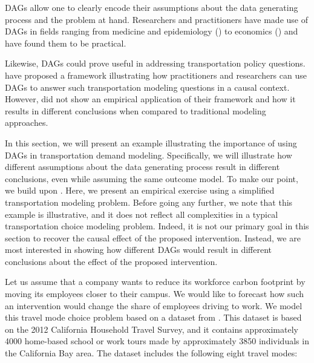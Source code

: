 DAGs allow one to clearly encode their assumptions about the data generating process and the problem at hand.
Researchers and practitioners have made use of DAGs in fields ranging from medicine and epidemiology (\citet{shrier_2008_reducing, sung_2012_reducing}) to economics (\citet{white_2011_covariate}) and have found them to be practical.

Likewise, DAGs could prove useful in addressing transportation policy questions.
\citet{brathwaite_2018_causal} have proposed a framework illustrating how practitioners and researchers can use DAGs to answer such transportation modeling questions in a causal context.
However, \citet{brathwaite_2018_causal} did not show an empirical application of their framework and how it results in different conclusions when compared to traditional modeling approaches.

In this section, we will present an example illustrating the importance of using DAGs in transportation demand modeling.
Specifically, we will illustrate how different assumptions about the data generating process result in different conclusions, even while assuming the same outcome model.
To make our point, we build upon \citet{brathwaite_2018_causal}.
Here, we present an empirical exercise using a simplified transportation modeling problem.
Before going any further, we note that this example is illustrative, and it does not reflect all complexities in a typical transportation choice modeling problem.
Indeed, it is not our primary goal in this section to recover the causal effect of the proposed intervention.
Instead, we are most interested in showing how different DAGs would result in different conclusions about the effect of the proposed intervention.

Let us assume that a company wants to reduce its workforce carbon footprint by moving its employees closer to their campus.
We would like to forecast how such an intervention would change the share of employees driving to work.
We model this travel mode choice problem based on a dataset from \citet{brathwaite_asymmetric}.
This dataset is based on the 2012 California Household Travel Survey, and it
contains approximately 4000 home-based school or work tours made by approximately 3850 individuals in the California Bay area.
The dataset includes the following eight travel modes:

